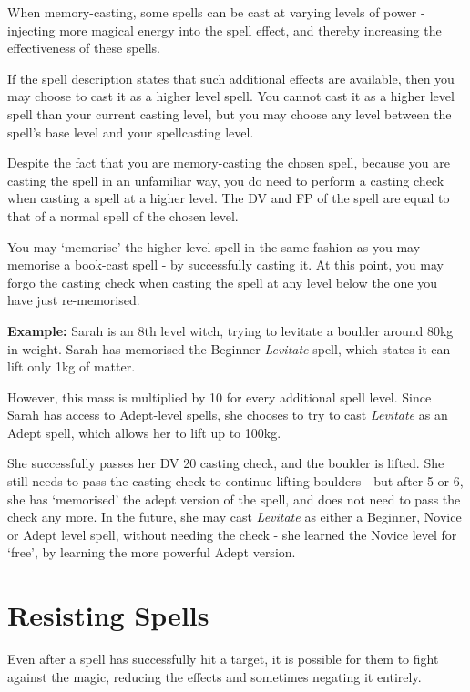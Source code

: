 When memory-casting, some spells can be cast at varying levels of power - injecting more magical energy into the spell effect, and thereby increasing the effectiveness of these spells. 

If the spell description states that such additional effects are available, then you may choose to cast it as a higher level spell. You cannot cast it as a higher level spell than your current casting level, but you may choose any level between the spell's base level and your spellcasting level. 

Despite the fact that you are memory-casting the chosen spell, because you are casting the spell in an unfamiliar way, you do need to perform a casting check when casting a spell at a higher level. The DV and FP of the spell are equal to that of a normal spell of the chosen level. 

You may `memorise' the higher level spell in the same fashion as you may memorise a book-cast spell - by successfully casting it. At this point, you may forgo the casting check when casting the spell at any level below the one you have just re-memorised. 

{\bf Example:} Sarah is an 8th level witch, trying to levitate a boulder around 80kg in weight. Sarah has memorised the Beginner {\it Levitate} spell, which states it can lift only 1kg of matter. 

However, this mass is multiplied by 10 for every additional spell level. Since Sarah has access to Adept-level spells, she chooses to try to cast {\it Levitate} as an Adept spell, which allows her to lift up to 100kg. 

She successfully passes her DV 20 casting check, and the boulder is lifted. She still needs to pass the casting check to continue lifting boulders - but after 5 or 6, she has `memorised' the adept version of the spell, and does not need to pass the check any more. In the future, she may cast {\it Levitate} as either a Beginner, Novice or Adept level spell, without needing the check - she learned the Novice level for `free', by learning the more powerful Adept version.  



\section{Resisting Spells}

Even after a spell has successfully hit a target, it is possible for them to fight against the magic, reducing the effects and sometimes negating it entirely. 

